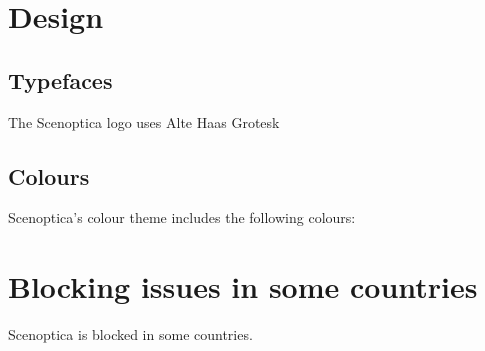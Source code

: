 \documentclass[12pt, a4paper]{article}
\begin{document}
\section*{Design}

\subsection*{Typefaces}

The Scenoptica logo uses Alte Haas Grotesk

\subsection*{Colours}

Scenoptica's colour theme includes the following colours:

\section*{Blocking issues in some countries}

Scenoptica is blocked in some countries.
\end{document}
